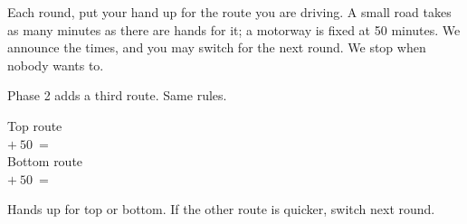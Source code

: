 \begin{center}
\begin{minipage}{0.86\linewidth}
{\LARGE Each round, put your hand up for the route you are driving. A small road
takes as many minutes as there are hands for it; a motorway is fixed at 50 minutes.
We announce the times, and you may switch for the next round. We stop when nobody
wants to.}

\vspace{1.2em}

{\Large\color{inkgrey} Phase 2 adds a third route. Same rules.}
\end{minipage}
\end{center}

\vspace*{\fill}

\newpage
{}

\vspace{0.6cm}

\begin{minipage}[c]{0.60\linewidth}
\begin{center}
\end{center}
\end{minipage}
\hfill
\begin{minipage}[c]{0.36\linewidth}
{\large
  Top route\\[0.5em]
  \hspace*{0.6cm}  $+\ 50\ =$
    \\[1.6em]
  Bottom route\\[0.5em]
  \hspace*{0.6cm}  $+\ 50\ =$
    }
\end{minipage}

\vspace{0.8cm}

{\large\color{inkgrey} Hands up for top or bottom. If the other route is quicker,
switch next round.}

\newpage
{}

\vspace{0.3cm}

